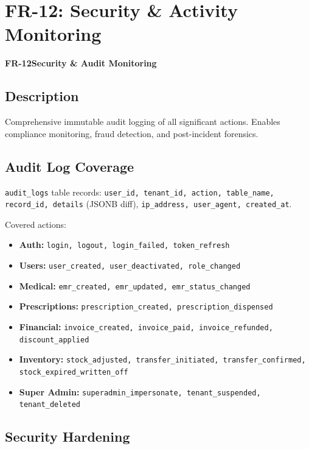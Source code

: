 \documentclass[12pt,a4paper]{report}
\newcommand{\moduleheader}[2]{%
  \par\vspace{6pt}%
  \noindent\colorbox{branddark}{\color{white}\textbf{\small #1}}\quad\textbf{\large #2}%
  \par\vspace{4pt}%
}
\begin{document}
\chapter{FR-12: Security \& Activity Monitoring}

\moduleheader{FR-12}{Security \& Audit Monitoring}

\section{Description}

Comprehensive immutable audit logging of all significant actions. Enables compliance monitoring, fraud detection, and post-incident forensics.

\section{Audit Log Coverage}

\texttt{audit\_logs} table records: \texttt{user\_id, tenant\_id, action, table\_name, record\_id, details} (JSONB diff), \texttt{ip\_address, user\_agent, created\_at}.

\vspace{4pt}
Covered actions:
\begin{itemize}
  \item \textbf{Auth:} \texttt{login, logout, login\_failed, token\_refresh}
  \item \textbf{Users:} \texttt{user\_created, user\_deactivated, role\_changed}
  \item \textbf{Medical:} \texttt{emr\_created, emr\_updated, emr\_status\_changed}
  \item \textbf{Prescriptions:} \texttt{prescription\_created, prescription\_dispensed}
  \item \textbf{Financial:} \texttt{invoice\_created, invoice\_paid, invoice\_refunded, discount\_applied}
  \item \textbf{Inventory:} \texttt{stock\_adjusted, transfer\_initiated, transfer\_confirmed, stock\_expired\_written\_off}
  \item \textbf{Super Admin:} \texttt{superadmin\_impersonate, tenant\_suspended, tenant\_deleted}
\end{itemize}

\section{Security Hardening}
\end{document}
